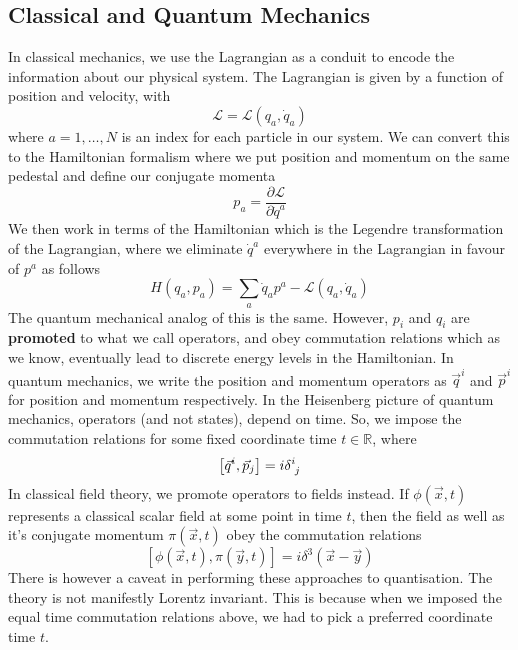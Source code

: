 \documentclass[11pt, oneside]{article}   	%
\theoremstyle{slanted}
\begin{document}
\subsection{Classical and Quantum Mechanics}
In classical mechanics, we use the Lagrangian 
as a conduit to encode the information about our 
physical system. The Lagrangian is given by a function 
of position and velocity, with 
\[
	\mathcal{ L }  = \mathcal{ L } \left( q _ a , \dot {q} _ a  \right) 
\] where $ a = 1 , \dots  , N $ is an index for each particle 
in our system. We can convert this to the Hamiltonian formalism 
where we put position and momentum on the same pedestal and 
define our conjugate momenta
\[
 p _ a = \frac{\partial  \mathcal{ L }}{\partial  \dot{q } ^ a  } 
\] We then work in terms of the Hamiltonian 
which is the Legendre transformation of the 
Lagrangian, where we eliminate $ \dot{ q }^ a   $
everywhere in the Lagrangian in favour of $ p^ a$ as follows 
\[
	H ( q_a , p _ a  ) = \sum _{ a } \dot{ q }_ a p ^ a  - \mathcal{ L } \left( q _ a , \dot{ q } _ a  \right)   
\] 
The quantum mechanical analog of this is the same. 
However, $ p_ i $ and $ q _ i $ are \textbf{promoted} to 
what we call operators, and obey commutation relations 
which as we know, eventually lead to discrete energy levels 
in the Hamiltonian. In quantum mechanics,
we write the position and momentum operators 
as $ \vec{q}^ i  $ and $ \vec{p} ^ i $ for position  
and momentum respectively. 
In the Heisenberg picture of quantum mechanics, 
operators (and not states), depend on time. 
So, we impose the commutation relations 
for some fixed coordinate time $ t \in \mathbb{ R } $, where 
\[
 \left[  \vec{q}^ i , \vec{p} _ j  \right]   = i  \delta \indices{ ^ i _ j }  
\]  
In classical field theory, we 
promote operators 
to fields instead. If $ \phi ( \vec{x} , t ) $  
represents a classical scalar field at some point in time $ t $, 
then the field as well as it's conjugate momentum $ \pi \left( \vec{x}, t   \right) $ 
obey the commutation relations
\[
	\left[  \phi ( \vec{x},  t ) , \pi ( \vec{y}, t  )  \right]  
	= i \delta ^ 3 \left( \vec{x} - \vec{y} \right) 
\] There is however a caveat in performing these 
approaches to quantisation. 
The theory is not manifestly Lorentz invariant. This is because 
when we imposed the equal time commutation 
relations above, we had to pick a preferred coordinate 
time $ t $. 
\end{document}
